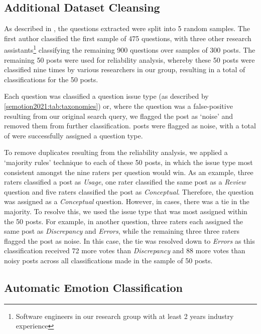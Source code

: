 \subsection{Additional Dataset Cleansing}
\label{semotion2021:ssec:method:filtering:classification}

As described in \citep{Cummaudo:2020icse}, the \SEMNumTotalPostsFromSO{} questions extracted were split into 5 random samples. The first author classified the first sample of  475 questions, with three other research assistants\footnote{Software engineers in our research group with at least 2 years industry experience} classifying the remaining 900 questions over samples of 300 posts. The remaining 50 posts were used for reliability analysis, whereby these 50 posts were classified nine times by various researchers in our group, resulting in a total of \SEMNumClassificationsFromBeyerIRRAnalysis{} classifications for the 50 posts.

Each question was classified a question issue type (as described by \cref{semotion2021:tab:taxonomies}) or, where the question was a false-positive resulting from our original search query, we flagged the post as `noise' and removed them from further classification. \SEMNumNoisyPosts{} posts were flagged as noise, with a total of \SEMNumTotalNonNoisePosts{} were successfully assigned a question type.

To remove duplicates resulting from the reliability analysis, we applied a `majority rules' technique to each of these 50 posts, in which the issue type most consistent amongst the nine raters per question would win. As an example, three raters classified a post as \textit{ Usage}, one rater classified the same post as a \textit{Review} question and {five} raters classified the post as \textit{Conceptual}. Therefore, the question was assigned as a \textit{Conceptual} question. However, in \SEMNumIRRPostsTiedMajority{} cases, there was a tie in the majority. To resolve this, we used the issue type that was most assigned within the 50 posts. For example, in another question, three raters each assigned the same post as \textit{Discrepancy} and \textit{Errors}, while the remaining three three raters flagged the post as noise. In this case, the tie was resolved down to \textit{Errors} as this classification received 72 more votes than \textit{Discrepancy} and 88 more votes than noisy posts across all classifications made in the sample of 50 posts. 

\subsection{Automatic Emotion Classification}

